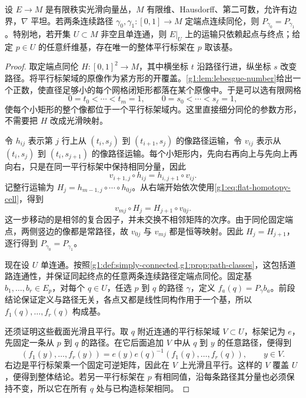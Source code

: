 \begin{theorem}
	\label{g1:thm:flat-path-independence}
	设 \(E\to M\) 是有限秩实光滑向量丛，\(M\) 有限维、Hausdorff、第二可数，允许有边界，\(\nabla\) 平坦。若两条连续路径 \(\gamma_0,\gamma_1:[0,1]\to M\) 定端点连续同伦，则 \(P_{\gamma_0}=P_{\gamma_1}\)。特别地，若开集 \(U\subset M\) 非空且单连通，则 \(E|_U\) 上的运输只依赖起点与终点；给定 \(p\in U\) 的任意纤维基，存在唯一的整体平行标架在 \(p\) 取该基。
\end{theorem}
\begin{proof}
	取定端点同伦 \(H:[0,1]^2\to M\)，其中横坐标 \(t\) 沿路径行进，纵坐标 \(s\) 改变路径。将平行标架域的原像作为紧方形的开覆盖。\cref{g1:lem:lebesgue-number}给出一个正数，使直径足够小的每个网格闭矩形都落在某个原像中。于是可以选有限网格
	\[
		0=t_0<\cdots<t_m=1,\qquad
		0=s_0<\cdots<s_\ell=1,
	\]
	使每个小矩形的整个像都位于一个平行标架域内。这里直接细分同伦的参数方形，不需要把 \(H\) 改成光滑映射。

	令 \(h_{ij}\) 表示第 \(j\) 行上从 \((t_i,s_j)\) 到 \((t_{i+1},s_j)\) 的像路径运输，令 \(v_{ij}\) 表示从 \((t_i,s_j)\) 到 \((t_i,s_{j+1})\) 的像路径运输。每个小矩形内，先向右再向上与先向上再向右，只是在同一平行标架中保持相同分量，因此
	\begin{equation}
		\label{g1:eq:flat-homotopy-cell}
		v_{i+1,j}\circ h_{ij}=h_{i,j+1}\circ v_{ij}.
	\end{equation}
	记整行运输为 \(H_j=h_{m-1,j}\circ\cdots\circ h_{0j}\)。从右端开始依次使用\eqref{g1:eq:flat-homotopy-cell}，得到
	\[
		v_{mj}\circ H_j=H_{j+1}\circ v_{0j}.
	\]
	这一步移动的是相邻的复合因子，并未交换不相邻矩阵的次序。由于同伦固定端点，两侧竖边的像都是常路径，故 \(v_{0j}\) 与 \(v_{mj}\) 都是恒等映射。因此 \(H_j=H_{j+1}\)，逐行得到 \(P_{\gamma_0}=P_{\gamma_1}\)。

	现在设 \(U\) 单连通。按照\cref{g1:def:simply-connected,g1:prop:path-classes}，这包括道路连通性，并保证同起终点的任意两条连续路径定端点同伦。固定基 \(b_1,\ldots,b_r\in E_p\)，对每个 \(q\in U\)，任选 \(p\) 到 \(q\) 的路径 \(\gamma\)，定义 \(f_a(q)=P_\gamma b_a\)。前段结论保证定义与路径无关，各点又都是线性同构作用于一个基，所以 \(f_1(q),\ldots,f_r(q)\) 构成基。

	还须证明这些截面光滑且平行。取 \(q\) 附近连通的平行标架域 \(V\subset U\)，标架记为 \(e\)，先固定一条从 \(p\) 到 \(q\) 的路径。在它后面追加 \(V\) 中从 \(q\) 到 \(y\) 的任意路径，便得到
	\[
		(f_1(y),\ldots,f_r(y))
		=e(y)e(q)^{-1}(f_1(q),\ldots,f_r(q)),\qquad y\in V.
	\]
	右边是平行标架乘一个固定可逆矩阵，因此在 \(V\) 上光滑且平行。这样的 \(V\) 覆盖 \(U\)，便得到整体结论。若另一平行标架在 \(p\) 有相同值，沿每条路径其分量也必须保持不变，所以它在所有 \(q\) 处与已构造标架相同。
\end{proof}

